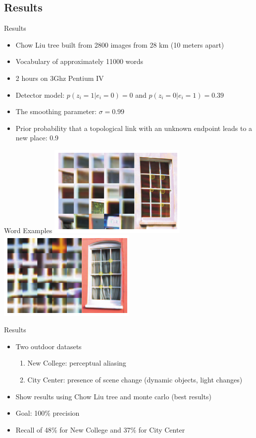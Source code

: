 \subsection{Results}
\begin{frame}{Results}
    \begin{itemize}
        \item Chow Liu tree built from 2800 images from 28 km (10 meters apart)
        \item Vocabulary of approximately 11000 words
        \item 2 hours on 3Ghz Pentium IV
        \item Detector model: $p(z_i=1|e_i=0)=0$ and $p(z_i=0|e_i=1)=0.39$
        \item The smoothing parameter: $\sigma=0.99$
        \item Prior probability that a topological link with an unknown endpoint leads to a new place: 0.9
    \end{itemize}
\end{frame}

\begin{frame}{Word Examples}
    \includegraphics[width=0.5\textwidth]{./media/word_top_left.png}
    \includegraphics[width=0.5\textwidth]{./media/word_bot_right.png}
\end{frame}

\begin{frame}{Results}
    \begin{itemize}
        \item Two outdoor datasets
            \begin{enumerate}
                \item New College: perceptual aliasing
                \item City Center: presence of scene change (dynamic objects, light changes)
            \end{enumerate}
        \item Show results using Chow Liu tree and monte carlo (best results)
        \item Goal: 100\% precision
        \item Recall of 48\% for New College and 37\% for City Center
    \end{itemize}
\end{frame}

